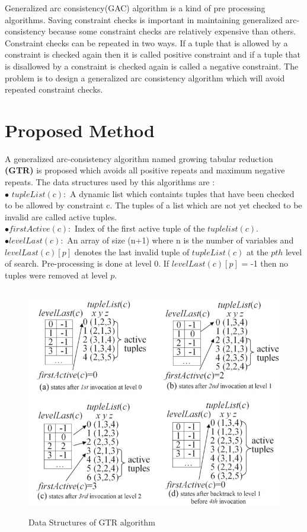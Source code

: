 \documentclass[11pt , conference]{IEEEtran}
\begin{document}
Generalized arc consistency(GAC) algorithm is a kind of pre processing algorithms. Saving constraint checks is important in maintaining generalized arc-consistency because some constraint checks are relatively expensive than others. Constraint checks can be repeated in two ways.
If a tuple that is allowed by a constraint  is checked again then it is called positive constraint and if a tuple that is disallowed by a constraint  is checked again is called a negative constraint. The problem is to design a generalized arc consistency algorithm which will avoid repeated constraint checks.\section{Proposed Method} 
\noindent A generalized arc-consistency algorithm named growing tabular reduction \textbf{(GTR)} is proposed which avoids all positive repeats and maximum negative repeats. The data structures used by this algorithms are :\\	
$\bullet$ $ tupleList(c) :$ A dynamic list which containts tuples that have been checked to be allowed by constraint c.  The tuples of a list which are not yet checked to be invalid are called active tuples.
\\$\bullet firstActive(c) :$ Index of the first active tuple of the $ tuplelist(c) $. 
\\$\bullet levelLast(c) :$ An array of size (n+1) where n is the number of variables and $ levelLast(c)[p] $ denotes the last invalid tuple of $ tupleList(c) $  at the $ pth $ level of search. Pre-processing is done at level 0.  If $ levelLast(c)[p] $ = -1 then no tuples were removed at level $ p $. 
\noindent
\begin{figure}[ht]
	\centering
	\includegraphics[width=50cm,height=10cm,keepaspectratio]{GTR.png}
	\caption{Data Structures of GTR algorithm}
	\label{fig:data_structures}
\end{figure}
\end{document}

